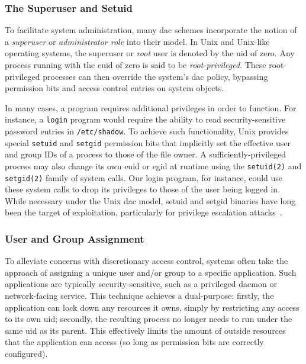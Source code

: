 \subsubsection*{The Superuser and Setuid}

To facilitate system administration, many \gls{dac} schemes incorporate the notion of
a \textit{superuser} or \textit{administrator role} into their model. In Unix and
Unix-like operating systems, the superuser or \textit{root} user is denoted by the
\gls{uid} of zero. Any process running with the \gls{euid} of zero is said to be
\textit{root-privileged}. These root-privileged processes can then override the system's
\gls{dac} policy, bypassing permission bits and access control entries on system objects.

In many cases, a program requires additional privileges in order to function. For
instance, a \texttt{login} program would require the ability to read security-sensitive
password entries in \texttt{/etc/shadow}. To achieve such functionality, Unix provides
special \texttt{setuid} and \texttt{setgid} permission bits that implicitly set the
effective user and group IDs of a process to those of the file owner.
A sufficiently-privileged process may also change its own \gls{euid} or \gls{egid} at
runtime using the \texttt{setuid(2)} and \texttt{setgid(2)} family of system calls. Our
login program, for instance, could use these system calls to drop its privileges to those
of the user being logged in. While necessary under the Unix \gls{dac} model, setuid and
setgid binaries have long been the target of exploitation, particularly for privilege
escalation attacks~\cite{dittmer2014_setuid, van_oorschot2020_tools_jewels,
jaeger2008_os_security}.

\subsubsection*{User and Group Assignment}

To alleviate concerns with discretionary access control, systems often take the approach
of assigning a unique user and/or group to a specific application. Such applications are
typically security-sensitive, such as a privileged daemon or network-facing service. This
technique achieves a dual-purpose: firstly, the application can lock down any resources it
owns, simply by restricting any access to its own \gls{uid}; secondly, the resulting
process no longer needs to run under the same \gls{uid} as its parent. This effectively
limits the amount of outside resources that the application can access (so long as
permission bits are correctly configured).

